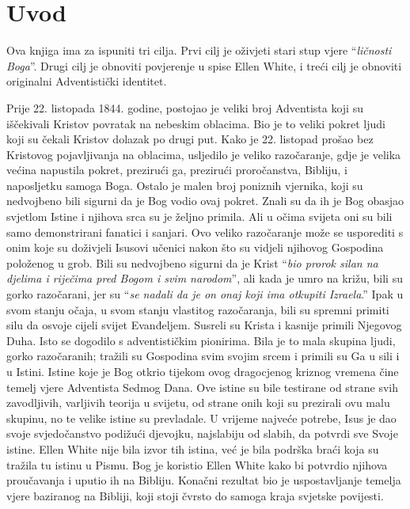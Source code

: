 \chapter*{Uvod}

Ova knjiga ima za ispuniti tri cilja. Prvi cilj je oživjeti stari stup vjere “\textit{ličnosti Boga}”. Drugi cilj je obnoviti povjerenje u spise Ellen White, i treći cilj je obnoviti originalni Adventistički identitet.

Prije 22. listopada 1844. godine, postojao je veliki broj Adventista koji su iščekivali Kristov povratak na nebeskim oblacima. Bio je to veliki pokret ljudi koji su čekali Kristov dolazak po drugi put. Kako je 22. listopad prošao bez Kristovog pojavljivanja na oblacima, usljedilo je veliko razočaranje, gdje je velika većina napustila pokret, prezirući ga, prezirući proročanstva, Bibliju, i naposljetku samoga Boga. Ostalo je malen broj poniznih vjernika, koji su nedvojbeno bili sigurni da je Bog vodio ovaj pokret. Znali su da ih je Bog obasjao svjetlom Istine i njihova srca su je željno primila. Ali u očima svijeta oni su bili samo demonstrirani fanatici i sanjari. Ovo veliko razočaranje može se usporediti s onim koje su doživjeli Isusovi učenici nakon što su vidjeli njihovog Gospodina položenog u grob. Bili su nedvojbeno sigurni da je Krist “\textit{bio prorok silan na djelima i riječima pred Bogom i svim narodom}”, ali kada je umro na križu, bili su gorko razočarani, jer su “\textit{se nadali da je on onaj koji ima otkupiti Izraela}.” Ipak u svom stanju očaja, u svom stanju vlastitog razočaranja, bili su spremni primiti silu da osvoje cijeli svijet Evanđeljem. Susreli su Krista i kasnije primili Njegovog Duha. Isto se dogodilo s adventističkim pionirima. Bila je to mala skupina ljudi, gorko razočaranih; tražili su Gospodina svim svojim srcem i primili su Ga u sili i u Istini. Istine koje je Bog otkrio tijekom ovog dragocjenog kriznog vremena čine temelj vjere Adventista Sedmog Dana. Ove istine su bile testirane od strane svih zavodljivih, varljivih teorija u svijetu, od strane onih koji su prezirali ovu malu skupinu, no te velike istine su prevladale. U vrijeme najveće potrebe, Isus je dao svoje svjedočanstvo podižući djevojku, najslabiju od slabih, da potvrdi sve Svoje istine. Ellen White nije bila izvor tih istina, već je bila podrška braći koja su tražila tu istinu u Pismu. Bog je koristio Ellen White kako bi potvrdio njihova proučavanja i uputio ih na Bibliju. Konačni rezultat bio je uspostavljanje temelja vjere baziranog na Bibliji, koji stoji čvrsto do samoga kraja svjetske povijesti.


